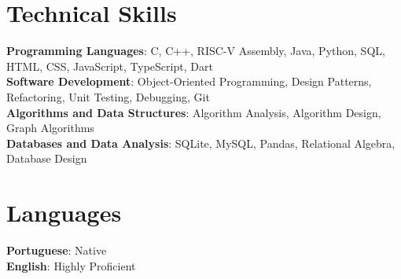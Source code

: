 \documentclass[a4paper,11pt]{article}
\begin{document}
\section{Technical Skills}
\begin{itemize}[leftmargin=0.15in, label={}]
	\small{\item{
	      \textbf{Programming Languages}{: C, C++, RISC-V Assembly, Java, Python, SQL, HTML, CSS, JavaScript, TypeScript, Dart} \\
	      \textbf{Software Development}{: Object-Oriented Programming, Design Patterns, Refactoring, Unit Testing, Debugging, Git} \\
	      \textbf{Algorithms and Data Structures}{: Algorithm Analysis, Algorithm Design, Graph Algorithms} \\
	      \textbf{Databases and Data Analysis}{: SQLite, MySQL, Pandas, Relational Algebra, Database Design}
	      }}
\end{itemize}

\section{Languages}
\begin{itemize}[leftmargin=0.15in, label={}]
	\small{\item{
	      \textbf{Portuguese}{: Native} \\
	      \textbf{English}{: Highly Proficient}
	      }}
\end{itemize}

\end{document}
